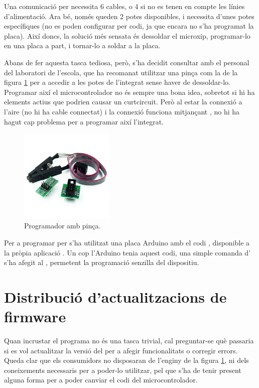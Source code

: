 Una comunicació per  necessita 6 cables, o 4 si no es tenen en compte
les línies d'alimentació. Ara bé, només queden 2 potes disponibles, i 
necessita d'unes potes específiques (no es poden configurar per codi, ja que
encara no s'ha programat la placa). Així doncs, la solució més sensata és
dessoldar el microxip, programar-lo en una placa a part, i tornar-lo a soldar
a la placa.

Abans de fer aquesta tasca tediosa, però, s'ha decidit consultar amb el
personal del laboratori de l'escola, que ha recomanat utilitzar una pinça com
la de la figura \ref{fig:programmer} per a accedir a les potes de l'integrat sense haver
de dessoldar-lo. Programar així el microcontrolador no és sempre una bona idea,
sobretot si hi ha elements actius que podrien causar un curtcircuit. Però al estar
la connexió  a l'aire (no hi ha cable connectat) i la connexió
 funciona mitjançant , no hi ha hagut cap problema per
a programar així l'integrat.

\begin{figure}[ht]
    \centering
    \includegraphics[width=0.4\textwidth]{images/device/programmer.jpeg}
    \caption{Programador  amb pinça.}
    \label{fig:programmer}
\end{figure}

Per a programar per  s'ha utilitzat una placa Arduino amb el codi
, disponible a la pròpia aplicació 
\cite{ArduinoIsp}. Un cop
l'Arduino tenia aquest codi, una simple comanda d' s'ha afegit
al , permetent la programació senzilla del dispositiu.

\section{Distribució d'actualitzacions de firmware}

Quan incrustar el programa no és una tasca trivial, cal preguntar-se què
passaria si  es vol actualitzar la versió del  per a afegir
funcionalitats o corregir errors. Queda clar que els consumidors no disposaran
de l'enginy de la figura \ref{fig:programmer}, ni dels coneixements necessaris
per a poder-lo utilitzar, pel que s'ha de tenir present alguna forma per a
poder canviar el codi del microcontrolador.

